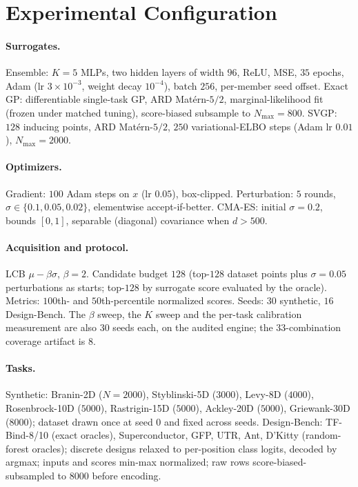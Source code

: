 \documentclass[letterpaper]{article}
\theoremstyle{plain}
\begin{document}
\section{Experimental Configuration}
\paragraph{Surrogates.} Ensemble: $K{=}5$ MLPs, two hidden layers of width $96$, ReLU, MSE, $35$ epochs, Adam (lr $3{\times}10^{-3}$, weight decay $10^{-4}$), batch $256$, per-member seed offset. Exact GP: differentiable single-task GP, ARD Mat\'ern-$5/2$, marginal-likelihood fit (frozen under matched tuning), score-biased subsample to $N_{\max}{=}800$. SVGP: $128$ inducing points, ARD Mat\'ern-$5/2$, $250$ variational-ELBO steps (Adam lr $0.01$), $N_{\max}{=}2000$.
\paragraph{Optimizers.} Gradient: $100$ Adam steps on $x$ (lr $0.05$), box-clipped. Perturbation: $5$ rounds, $\sigma\in\{0.1,0.05,0.02\}$, elementwise accept-if-better. CMA-ES: initial $\sigma{=}0.2$, bounds $[0,1]$, separable (diagonal) covariance when $d{>}500$.
\paragraph{Acquisition and protocol.} LCB $\mu-\beta\sigma$, $\beta{=}2$. Candidate budget $128$ (top-$128$ dataset points plus $\sigma{=}0.05$ perturbations as starts; top-$128$ by surrogate score evaluated by the oracle). Metrics: $100$th- and $50$th-percentile normalized scores. Seeds: $30$ synthetic, $16$ Design-Bench. The $\beta$ sweep, the $K$ sweep and the per-task calibration measurement are also $30$ seeds each, on the audited engine; the $33$-combination coverage artifact is $8$.
\paragraph{Tasks.} Synthetic: Branin-2D ($N{=}2000$), Styblinski-5D ($3000$), Levy-8D ($4000$), Rosenbrock-10D ($5000$), Rastrigin-15D ($5000$), Ackley-20D ($5000$), Griewank-30D ($8000$); dataset drawn once at seed $0$ and fixed across seeds. Design-Bench: TF-Bind-8/10 (exact oracles), Superconductor, GFP, UTR, Ant, D'Kitty (random-forest oracles); discrete designs relaxed to per-position class logits, decoded by argmax; inputs and scores min-max normalized; raw rows score-biased-subsampled to $8000$ before encoding.
\end{document}
